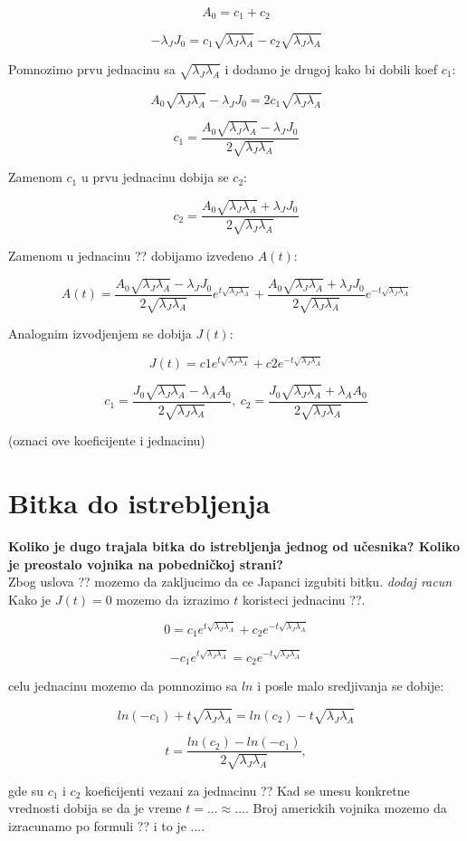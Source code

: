 \documentclass{article}
\newcommand{\laj}{\sqrt{\lambda_J\lambda_A}}
\begin{document}
\[
  A_0 = c_1 + c_2
\]

\[
  -\lambda_{J}J_0 = c_1 \laj - c_2 \laj
\]

Pomnozimo prvu jednacinu sa \( \laj \) i dodamo je
drugoj kako bi dobili koef \( c_1 \):

\[
  A_0 \laj - \lambda_{J}J_0 = 2 c_1 \laj
\]

\[
  c_1 = \frac{A_0 \laj - \lambda_J J_0}{2\laj }
\]

Zamenom \(c_1\) u prvu jednacinu dobija se \(c_2\):

\[
  c_2 = \frac{A_0 \laj + \lambda_J J_0}{2\laj }
\]

Zamenom u jednacinu ?? dobijamo izvedeno \(A(t)\):

\[
  A(t) = \frac{A_0 \laj - \lambda_J J_0}{2 \laj } e^{t \laj } + \frac{A_0 \laj +
\lambda_J J_0}{2 \laj } e^{-t \laj}
\]

Analognim izvodjenjem se dobija \(J(t)\):

\[
  J(t) = c1 e^{t \laj} + c2 e^{-t \laj}
\]

\[
 c_1 = \frac{J_0 \laj- \lambda_A A_0}{2\laj},\ 
 c_2 = \frac{J_0 \laj+ \lambda_A A_0}{2 \laj}
\]

(oznaci ove koeficijente i jednacinu)

\section*{Bitka do istrebljenja}

\textbf{Koliko je dugo trajala bitka do istrebljenja jednog od
učesnika? Koliko je preostalo vojnika na pobedničkoj
strani?} \\

Zbog uslova ?? mozemo da zakljucimo da ce Japanci izgubiti bitku.
\emph{dodaj racun} \\
Kako je \(J(t) = 0\) mozemo da izrazimo \(t\) koristeci
jednacinu ??.

\[
  0 = c_1 e^{t \laj} + c_2 e^{-t \laj}
\]

\[
  -c_1 e^{t \laj} = c_2 e^{-t \laj}
\]

celu jednacinu mozemo da pomnozimo sa \(ln\) i posle malo sredjivanja se
dobije:

\[
  ln(-c_1) + t\laj= ln(c_2) - t\laj
\]

\[
  t = \frac{ln(c_2) - ln(-c_1)}{2\laj}, 
\]

gde su \(c_1\) i \(c_2\) koeficijenti vezani za jednacinu ?? Kad se
unesu konkretne vrednosti dobija se da je vreme \(t = ... \approx ...\).
Broj americkih vojnika mozemo da izracunamo po formuli ?? i to je
\(...\).
\end{document}
